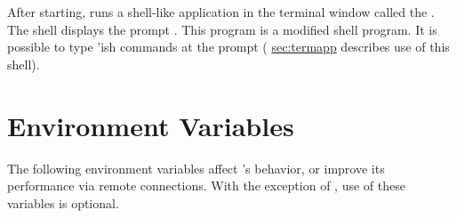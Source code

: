 After starting, \sr{} runs a shell-like application in the
terminal window called the .  The \sr{} shell displays the
prompt .  This program is  a modified  shell program. It is possible to type
'ish \sr{} commands at the prompt ( \hyperref{a later section}{Section~}{}{sec:termapp} describes use of this shell).


\section{Environment Variables}
\label{sec:environ} 

\newcommand{\envitem}[1]{\item[\envvar{#1}]\latex{\mbox{}\\}}

The following environment variables affect \sr{}'s behavior, or
improve its performance via remote connections.  With the exception of
, use of these variables is
optional.

